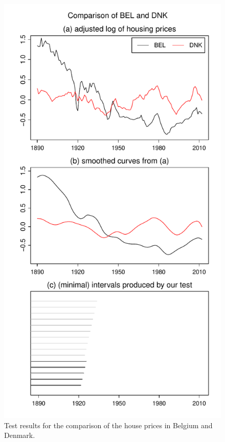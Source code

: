 \documentclass[12pt]{article}
\begin{document}
\begin{figure}
\hspace{0.1cm}
\begin{minipage}[t]{0.24\textwidth}
\includegraphics[width=\textwidth]{output/plots/hp/BEL_vs_DNK}
\caption{Test results for the comparison of the house prices in Belgium and Denmark.}\label{fig:hp:Belgium:Denmark}
\end{minipage}

\end{figure}
\end{document}
